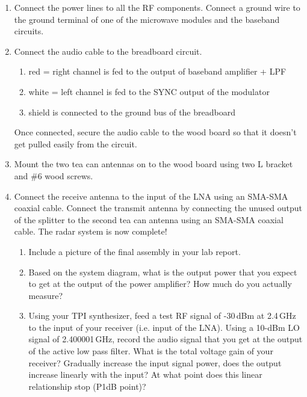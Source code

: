\documentclass[letterpaper, 11pt]{article}
\begin{document}
\begin{enumerate}
	\item Connect the power lines to all the RF components. Connect a ground wire to the ground terminal of one of the microwave modules and the baseband circuits. 
	
	\item Connect the audio cable to the breadboard circuit.
		\begin{enumerate}
			\item red = right channel is fed to the output of baseband amplifier + LPF
			\item white = left channel is fed to the SYNC output of the modulator
			\item shield is connected to the ground bus of the breadboard
		\end{enumerate} 

	Once connected, secure the audio cable to the wood board so that it doesn't get pulled easily from the circuit. 
		
	\item Mount the two tea can antennas on to the wood board using two L bracket and \#6 wood screws. 
	
	\item Connect the receive antenna to the input of the LNA using an SMA-SMA coaxial cable. Connect the transmit antenna by connecting the unused output of the splitter to the second tea can antenna using an SMA-SMA coaxial cable. The radar system is now complete! 
		\begin{enumerate}
			\item Include a picture of the final assembly in your lab report.
			
			\item Based on the system diagram, what is the output power that you expect to get at the output of the power amplifier? How much do you actually measure?
			
			\item Using your TPI synthesizer, feed a test RF signal of -30\,dBm at 2.4\,GHz to the input of your receiver (i.e. input of the LNA). Using a 10-dBm LO signal of 2.400001\,GHz, record the audio signal that you get at the output of the active low pass filter. What is the total voltage gain of your receiver? Gradually increase the input signal power, does the output increase linearly with the input? At what point does this linear relationship stop (P1dB point)?
		\end{enumerate}
	
\end{enumerate}
\end{document}
